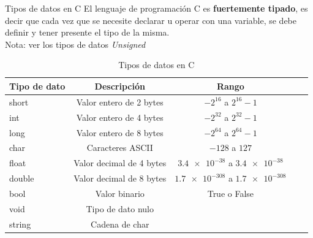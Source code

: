 \documentclass[xcolor=pdftex,table,11pt]{beamer}
\begin{document}
\begin{frame} {Tipos de datos en C}
El lenguaje de programación C es \textbf{fuertemente tipado}, es decir que cada vez que se necesite declarar u operar con una variable, se debe definir y tener presente el tipo de la misma. \\
Nota: ver los tipos de datos \textit{Unsigned}
\begin{table}
\begin{tabular}{l | c | c | c | l }
Tipo de dato & Descripción & Rango  \\
\hline \hline
short & Valor entero de 2 bytes & $-2^{16}$ a $2^{16} -1 $\\ 
int & 	Valor entero de 4 bytes & $-2^{32}$ a $2^{32} -1 $\\ 
long & 	Valor entero de 8 bytes & $-2^{64}$ a $2^{64} -1 $\\ 
char & Caracteres ASCII & $-128 $ a $127$\\ 
float & Valor decimal de 4 bytes & $\num{3.4e-38} $ a $\num{3.4e-38}$\\ 
double & Valor decimal de 8 bytes & $\num{1.7e-308} $ a $\num{1.7e-308}$\\ 
bool & Valor binario &True o False\\ 
void & Tipo de dato nulo &\\ 
 string & Cadena de char  &\\ 
\end{tabular}
\caption{Tipos de datos en C}

\end{table}

\end{frame}
\end{document}
